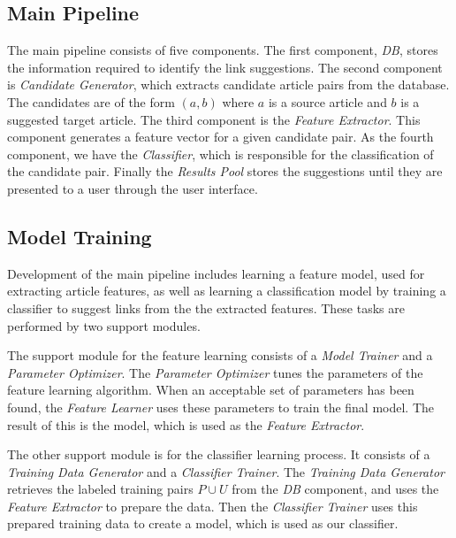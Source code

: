 \subsection{Main Pipeline}
The main pipeline consists of five components. The first component, \emph{DB}, stores the information required to identify the link suggestions. The second component is \emph{Candidate Generator}, which extracts candidate article pairs from the database. The candidates are of the form $(a,b)$ where $a$ is a source article and $b$ is a suggested target article. The third component is the \emph{Feature Extractor}. This component generates a feature vector for a given candidate pair. As the fourth component, we have the \emph{Classifier}, which is responsible for the classification of the candidate pair. Finally the \emph{Results Pool} stores the suggestions until they are presented to a user through the user interface.

\subsection{Model Training}
Development of the main pipeline includes learning a feature model, used for extracting article features, as well as learning a classification model by training a classifier to suggest links from the the extracted features. These tasks are performed by two support modules.

The support module for the feature learning consists of a \emph{Model Trainer} and a \emph{Parameter Optimizer}. The \emph{Parameter Optimizer} tunes the parameters of the feature learning algorithm. When an acceptable set of parameters has been found, the \emph{Feature Learner} uses these parameters to train the final model. The result of this is the model, which is used as the \emph{Feature Extractor}.

The other support module is for the classifier learning process. It consists of a \emph{Training Data Generator} and a \emph{Classifier Trainer}. The \emph{Training Data Generator} retrieves the labeled training pairs $P \cup U$ from the \emph{DB} component, and uses the \emph{Feature Extractor} to prepare the data. Then the \emph{Classifier Trainer} uses this prepared training data to create a model, which is used as our classifier.

